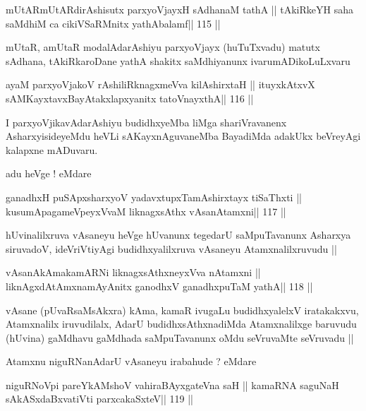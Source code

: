 \begin{shl}
mUtARmUtARdirAshisutx parxyoVjayxH sAdhanaM tathA ||
tAkiRkeYH saha saMdhiM ca cikiVSaRMnitx yathAbalamf\hfill || 115 ||
\end{shl}

\begin{artha}
mUtaR, amUtaR modalAdarAshiyu parxyoVjayx (huTuTxvadu) matutx sAdhana,
tAkiRkaroDane yathA shakitx saMdhiyanunx ivarumADikoLuLxvaru 
\end{artha}

\begin{shl}
ayaM parxyoVjakoV rAshiliRknagxmeVva kilA\s\s shirxtaH ||
ituyxkAtxvX sAMKayxtavxBayAtakxlapxyanitx tatoV\s nayxthA\hfill || 116 ||
\end{shl}

\begin{artha}
I parxyoVjikavAdarAshiyu budidhxyeMba liMga shariVravanenx
AsharxyisideyeMdu heVLi sAKayxnAguvaneMba BayadiMda adakUkx beVreyAgi
kalapxne mADuvaru.

adu heVge ! eMdare
\end{artha}

\begin{shl}
ganadhxH puSApxsharxyoV yadavxtupxTamAshirxtayx tiSaThxti ||
kusumApagameV\s peyxVvaM liknagxsAthx vAsanA\s\s tamxni\hfill || 117 ||
\end{shl}

\begin{artha}
hUvinalilxruva vAsaneyu heVge hUvanunx tegedarU saMpuTavanunx Asharxya
siruvadoV, ideVriVtiyAgi budidhxyalilxruva vAsaneyu Atamxnalilxruvudu ||
\end{artha}

\begin{shl}
vAsanAkAmakamARNi liknagxsAthxneyxVva nA\s\s tamxni ||
liknAgxdAtAmxnamAyAnitx ganodhxV ganadhxpuTaM yathA\hfill || 118 ||
\end{shl}

\begin{artha}
vAsane (pUvaRsaMsAkxra) kAma, kamaR ivugaLu budidhxyalelxV
iratakakxvu, Atamxnalilx iruvudilalx, AdarU budidhxsAthxnadiMda
Atamxnalilxge baruvudu (hUvina) gaMdhavu gaMdhada saMpuTavanunx oMdu
seVruvaMte seVruvadu ||

Atamxnu niguRNanAdarU vAsaneyu irabahude ? eMdare
\end{artha}

\begin{shl}
niguRNoV\s pi pareYkAMshoV vahiraBAyxgateVna saH ||
kamaRNA saguNaH sAkASxdaBxvatiVti parxcakaSxteV\hfill || 119 ||
\end{shl}

